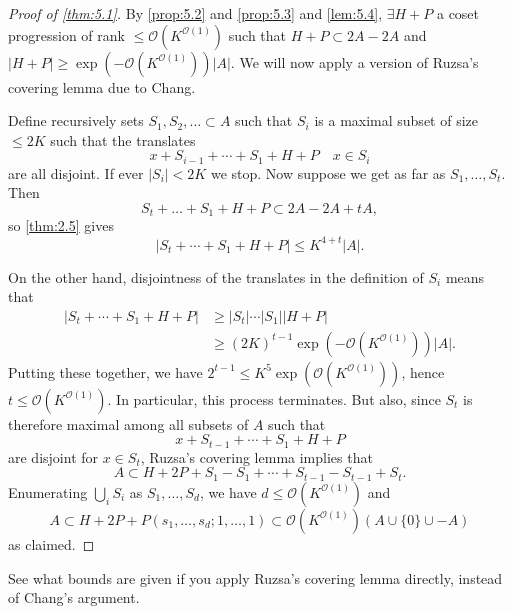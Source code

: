 \documentclass{article}
\numberwithin{equation}{section}
\begin{document}
\begin{proof}[Proof of \cref{thm:5.1}]
  By \cref{prop:5.2} and \cref{prop:5.3} and \cref{lem:5.4}, $\exists H+P$ a coset progression of rank $\leq \mathcal{O}(K^{\mathcal{O}(1)})$ such that $H+P \subset 2A - 2A$ and $|H+P| \geq \exp(-\mathcal{O}(K^{\mathcal{O}(1)}))|A|$.
  We will now apply a version of Ruzsa's covering lemma due to Chang.

  Define recursively sets $S_1, S_2, \dotsc \subset A$ such that $S_i$ is a maximal subset of size $\leq 2K$ such that the translates
  \begin{equation*}
    x + S_{i-1} + \dotsb + S_1 + H + P \quad x \in S_i
  \end{equation*}
  are all disjoint. If ever $|S_i| < 2K$ we stop.
  Now suppose we get as far as $S_1, \dotsc, S_t$. Then
  \begin{equation*}
    S_t + \dotsc + S_1 + H + P \subset 2A - 2A + tA,
  \end{equation*}
  so \cref{thm:2.5} gives
  \begin{equation*}
    |S_t + \dotsb + S_1 + H + P| \leq K^{4+t} |A|.
  \end{equation*}

  On the other hand, disjointness of the translates in the definition of $S_i$ means that
  \begin{align*}
    |S_t + \dotsb + S_1 + H + P| &\geq |S_t| \dotsm |S_1| |H+P| \\
                                 &\geq (2K)^{t-1} \exp(-\mathcal{O}(K^{\mathcal{O}(1)}))|A|.
  \end{align*}
  Putting these together, we have $2^{t-1} \leq K^5 \exp(\mathcal{O}(K^{\mathcal{O}(1)}))$, hence $t \leq \mathcal{O}(K^{\mathcal{O}(1)})$. In particular, this process terminates.
  But also, since $S_t$ is therefore maximal among all subsets of $A$ such that
  \begin{equation*}
    x + S_{t-1} + \dotsb + S_1 + H +P
  \end{equation*}
  are disjoint for $x \in S_t$, Ruzsa's covering lemma implies that
  \begin{equation*}
    A \subset H + 2P + S_1 - S_1 + \dotsb + S_{t-1} - S_{t-1} + S_t.
  \end{equation*}
  Enumerating $\bigcup_i S_i$ as $S_1, \dotsc, S_d$, we have $d \leq \mathcal{O}(K^{\mathcal{O}(1)})$ and
  \begin{equation*}
    A \subset H + 2P + P(s_1, \dotsc, s_d; 1, \dotsc, 1) \subset \mathcal{O}(K^{\mathcal{O}(1)})(A \cup \{0\} \cup -A)
  \end{equation*}
  as claimed.
\end{proof}
\begin{ex}
  See what bounds are given if you apply Ruzsa's covering lemma directly, instead of Chang's argument.
\end{ex}
\end{document}
